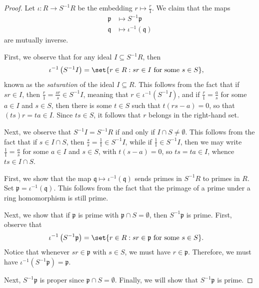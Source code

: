 \documentclass[10pt]{mypackage}
\begin{document}
\begin{proof}
  Let $\iota\colon R\rightarrow S^{-1}R$ be the embedding $r\mapsto \frac{r}{1}$. We claim that the maps
  \begin{align*}
    \mathfrak{p}&\mapsto S^{-1} \mathfrak{p}\\
    \mathfrak{q} &\mapsto \iota^{-1}\left( \mathfrak{q} \right)
  \end{align*}
  are mutually inverse.

  First, we observe that for any ideal $I\subseteq S^{-1}R$, then
  \begin{align*}
    \iota^{-1}\left( S^{-1}I \right) &= \set{r\in R : sr\in I\text{ for some }s\in S},
  \end{align*}
  known as the \textit{saturation} of the ideal $I\subseteq R$. This follows from the fact that if $sr\in I$, then $\frac{r}{1} = \frac{sr}{s}\in S^{-1}I$, meaning that $r\in \iota^{-1}\left( S^{-1}I \right)$, and if $\frac{r}{1} = \frac{a}{s}$ for some $a\in I$ and $s\in S$, then there is some $t\in S$ such that $t\left( rs-a \right) = 0$, so that $\left( ts \right)r = ta\in I$. Since $ts\in S$, it follows that $r$ belongs in the right-hand set.

  Next, we observe that $S^{-1}I = S^{-1}R$ if and only if $I\cap S \neq \emptyset$. This follows from the fact that if $s\in I\cap S$, then $\frac{s}{s} = \frac{1}{1}\in S^{-1}I$, while if $\frac{1}{1}\in S^{-1}I$, then we may write $\frac{1}{1} = \frac{a}{s}$ for some $a\in I$ and $s\in S$, with $t\left( s-a \right) = 0$, so $ts = ta\in I$, whence $ts\in I\cap S$.

  First, we show that the map $ \mathfrak{q}\mapsto \iota^{-1}\left( \mathfrak{q} \right) $ sends primes in $S^{-1}R$ to primes in $R$. Set $ \mathfrak{p} = \iota^{-1}\left( \mathfrak{q} \right) $. This follows from the fact that the primage of a prime under a ring homomorphism is still prime.

  Next, we show that if $ \mathfrak{p} $ is prime with $ \mathfrak{p}\cap S = \emptyset $, then $ S^{-1} \mathfrak{p} $ is prime. First, observe that
  \begin{align*}
    \iota^{-1}\left( S^{-1} \mathfrak{p} \right) &= \set{r\in R : sr\in \mathfrak{p}\text{ for some }s\in S}.
  \end{align*}
  Notice that whenever $sr\in \mathfrak{p}$ with $s\in S$, we must have $r\in \mathfrak{p}$. Therefore, we must have $\iota^{-1}\left( S^{-1} \mathfrak{p} \right) = \mathfrak{p}$.

  Next, $S^{-1} \mathfrak{p}$ is proper since $ \mathfrak{p}\cap S = \emptyset $. Finally, we will show that $S^{-1} \mathfrak{p}$ is prime.


\end{proof}
\end{document}
